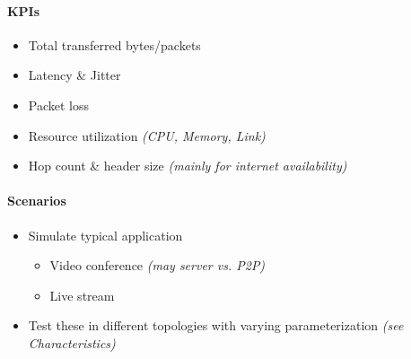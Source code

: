 \paragraph{KPIs} %
\label{par:KPIs}
\begin{itemize}
    \item Total transferred bytes/packets
    \item Latency \& Jitter
    \item Packet loss
    \item Resource utilization \textit{(CPU, Memory, Link)}
    \item Hop count \& header size \textit{(mainly for internet availability)}
\end{itemize}

\paragraph{Scenarios} %
\label{par:Scenarios}
\begin{itemize}
    \item Simulate typical application
    \begin{itemize}
        \item Video conference \textit{(may server vs. P2P)}
        \item Live stream
    \end{itemize}
    \item Test these in different topologies with varying parameterization
        \textit{(see Characteristics)}
\end{itemize}
